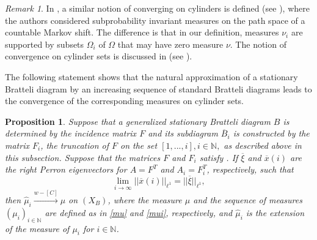 \documentclass[11pt,reqno]{amsart}
\theoremstyle{definition}
\theoremstyle{remark}
\newtheorem{remark}[definition]{Remark}
\theoremstyle{plain}
\newtheorem{prop}[definition]{Proposition}
\def\ol{\overline}
\def\wh{\widehat}
\newcommand{\N}{\mathbb N}
\newcommand{\be}{\begin{equation}}
\newcommand{\ee}{\end{equation}}
\numberwithin{equation}{section}
\begin{document}
\begin{remark}
In \cite{Iommi_Veloso_2021}, a similar notion of converging on cylinders is defined (see \cite[Definition 3.14]{Iommi_Veloso_2021}), where the authors considered subprobability invariant measures on the path space of a countable Markov shift. The difference is that in our definition, measures $\nu_i$ are supported by subsets $\Omega_i$ of $\Omega$ that may have zero measure $\nu$. The notion of convergence on cylinder sets is discussed in  (see ).
\end{remark}

The following statement shows that the natural approximation of a stationary Bratteli diagram by an increasing sequence of standard Bratteli diagrams leads to the convergence of the corresponding measures on cylinder sets. 

\begin{prop} \label{prop appr truncated matrices}
Suppose that a generalized stationary Bratteli diagram $B$ is determined by the incidence matrix $F$ and its subdiagram $\ol B_i$ is constructed by the matrix $F_i$, the truncation of $F$ on the set $[1, ..., i], i \in \N,$ as described above in this subsection. Suppose that the matrices $F$ and $F_i$
satisfy . If $\ol \xi$ and
$\ol x(i)$ are the right Perron eigenvectors for $A = F^T$ and 
$A_i = F_i^T$, respectively, such that 
\be\label{eq s7 lim x is xi}
\lim_{i\to \infty}|| \ol x(i)||_{\ell^1} = || \ol \xi||_{\ell^1},
\ee
then $\wh \mu_i \xrightarrow{w-[C]} \mu$ on $(X_B)$, where  
the measure $\mu$ and the sequence of measures $(\mu_i)_{i \in \N}$ are defined as in \eqref{mu} and \eqref{mui}, respectively, and $\wh \mu_i$ is the extension of the measure of $\mu_i$ for $i \in \N$. 
 \end{prop}
\end{document}
